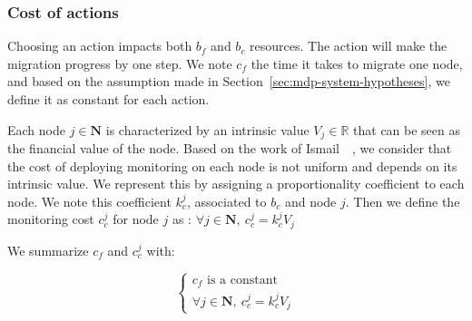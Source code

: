 \subsubsection{Cost of actions}
Choosing an action impacts both $b_f$ and $b_c$ resources. The action will make the migration progress by one step.
We note $c_f$ the time it takes to migrate one node, and based on the assumption made in Section~\ref{sec:mdp-system-hypotheses}, we define it as constant for each action.

Each node $j \in \textbf{N}$ is characterized by an intrinsic value $V_j \in \mathbb{R}$ that can be seen as the financial value of the node.
Based on the work of Ismail~\etal~\cite{interdep-ismail2017}, we consider that the cost of deploying monitoring on each node is not uniform and depends on its intrinsic value. We represent this by assigning a proportionality coefficient to each node.
We note this coefficient $k^j_{c}$, associated to $b_c$ and node $j$.
Then we define the monitoring cost $c_c^j$ for node $j$ as : $\forall j \in \textbf{N},~ c_c^j = k^j_{c}  V_j$

We summarize $c_f$ and $c_c^j$ with:

\begin{equation}
  \begin{cases}
    c_f\text{ is a constant}\\
   \forall j \in \textbf{N},~ c_c^j = k^j_{c}  V_j 
  \end{cases}
\end{equation}

